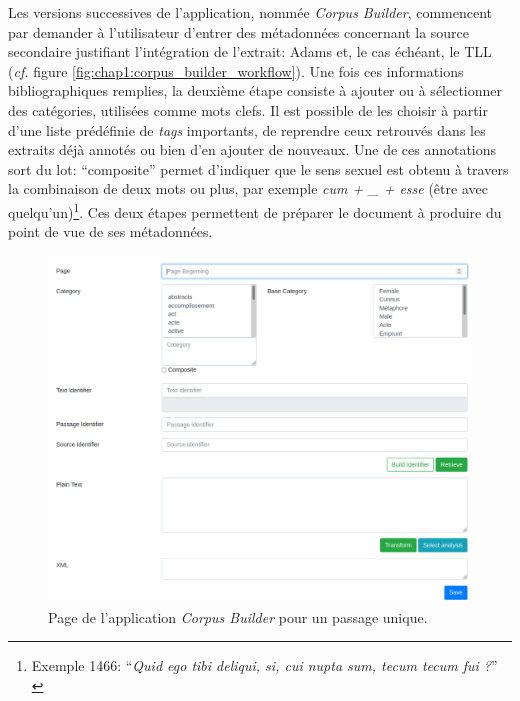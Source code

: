 Les versions successives de l'application, nommée \textit{Corpus Builder}, commencent par demander à l'utilisateur d'entrer des métadonnées concernant la source secondaire justifiant l'intégration de l'extrait: Adams et, le cas échéant, le TLL (\textit{cf.} figure \ref{fig:chap1:corpus_builder_workflow}). Une fois ces informations bibliographiques remplies, la deuxième étape consiste à ajouter ou à sélectionner des catégories, utilisées comme mots clefs. Il est possible de les choisir à partir d'une liste prédéfinie de \textit{tags} importants, de reprendre ceux retrouvés dans les extraits déjà annotés ou bien d'en ajouter de nouveaux. Une de ces annotations sort du lot: \enquote{composite} permet d'indiquer que le sens sexuel est obtenu à travers la combinaison de deux mots ou plus, par exemple \textit{cum + \_ + esse} (être avec quelqu'un)\footnote{Exemple 1466: \enquote{\textit{Quid ego tibi deliqui, si, cui nupta sum, tecum {tecum} fui ?}} \textcite[p.~177]{adams}}. Ces deux étapes permettent de préparer le document à produire du point de vue de ses métadonnées.

\begin{figure}
    \centering
    \includegraphics[width=\textwidth]{figures/chap1/part3/exemplier/corpus_builder_single.png}
    \caption{Page de l'application \textit{Corpus Builder} pour un passage unique.}
    \label{fig:chap1:corpus_builder_single}
\end{figure}

